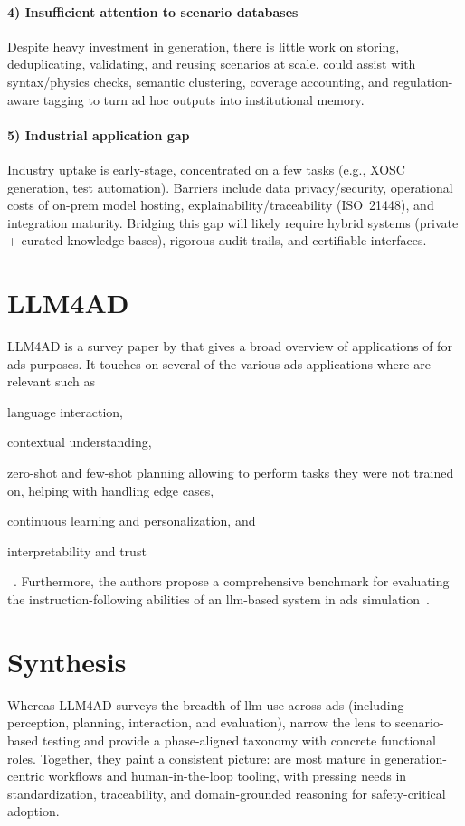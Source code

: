 \paragraph{4) Insufficient attention to scenario databases}
Despite heavy investment in generation, there is little work on storing,
deduplicating, validating, and reusing scenarios at scale. 
could assist with syntax/physics checks, semantic clustering, coverage
accounting, and regulation-aware tagging to turn ad hoc outputs into
institutional memory.

\paragraph{5) Industrial application gap}
Industry uptake is early-stage, concentrated on a few tasks (e.g., XOSC
generation, test automation). Barriers include data privacy/security,
operational costs of on-prem model hosting, explainability/traceability
(ISO~21448), and integration maturity. Bridging this gap will likely require
hybrid systems (private  + curated knowledge bases), rigorous
audit trails, and certifiable interfaces.

\section{LLM4AD}

LLM4AD is a survey paper by \citeauthor{LLM4AD} that gives a broad overview of
applications of  for \acrlong{ads} purposes. It touches on
several of the various \acrshort{ads} applications where  are
relevant such as
\begin{inparaenum}
    \item language interaction,
    \item contextual understanding,
    \item zero-shot and few-shot planning allowing  to perform
    tasks they were not trained on, helping with handling edge cases,
    \item continuous learning and personalization, and
    \item interpretability and trust \end{inparaenum}~\cite[p.~2]{LLM4AD}.
Furthermore, the authors propose a comprehensive benchmark for evaluating the
instruction-following abilities of an \acrshort{llm}-based system in
\acrshort{ads} simulation~\cite[p.~1]{LLM4AD}.

\section{Synthesis}

Whereas LLM4AD surveys the breadth of \acrshort{llm} use across \acrshort{ads}
(including perception, planning, interaction, and evaluation),
\citeauthor{surveyLLMScenarioBasedTesting} narrow the lens to scenario-based
testing and provide a phase-aligned taxonomy with concrete functional roles.
Together, they paint a consistent picture:  are most mature in
generation-centric workflows and human-in-the-loop tooling, with pressing needs
in standardization, traceability, and domain-grounded reasoning for
safety-critical adoption.
